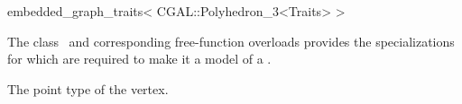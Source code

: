 

\begin{ccRefClass}{embedded_graph_traits< CGAL::Polyhedron_3<Traits> >}


\ccDefinition

The class \ccRefName\ and corresponding free-function overloads 
provides the specializations for  
which are required to make it a model of a .


\ccTypes
  {The point type of the vertex.}

\ccIsModel
{}

\ccSeeAlso

\end{ccRefClass}


